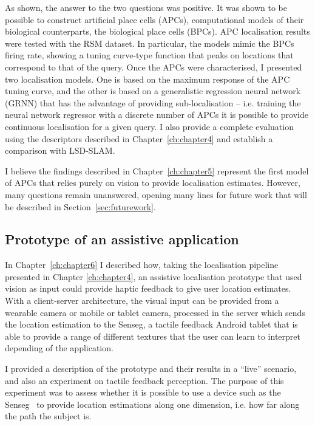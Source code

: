 As shown, the answer to the two questions was positive. It was shown to be possible to construct artificial place cells (APCs), computational models of their biological counterparts, the biological place cells (BPCs). APC localisation results were tested with the RSM dataset. In particular, the models mimic the BPCs firing rate, showing a tuning curve-type function that peaks on locations that correspond to that of the query. Once the APCs were characterised, I presented two localisation models. One is based on the maximum response of the APC tuning curve, and the other is based on a generalistic regression neural network (GRNN) that has the advantage of providing sub-localisation -- i.e. training the neural network regressor with a discrete number of APCs it is possible to provide continuous localisation for a given query. I also provide a complete evaluation using the descriptors described in Chapter~\ref{ch:chapter4} and establish a comparison with LSD-SLAM.

I believe the findings described in Chapter~\ref{ch:chapter5} represent the first model of APCs that relies purely on vision to provide localisation estimates. However, many questions remain unanswered, opening many lines for future work that will be described in Section~\ref{sec:futurework}. 

\subsection{Prototype of an assistive application}

In Chapter~\ref{ch:chapter6} I described how, taking the localisation pipeline presented in Chapter \ref{ch:chapter4}, an assistive localisation prototype that used vision as input could provide haptic feedback to give user location estimates. With a client-server architecture, the visual input can be provided from a wearable camera or mobile or tablet camera, processed in the server which sends the location estimation to the Senseg\texttrademark, a tactile feedback Android tablet that is able to provide a range of different textures that the user can learn to interpret depending of the application.

I provided a description of the prototype and their results in a ``live'' scenario, and also an experiment on tactile feedback perception. The purpose of this experiment was to assess whether it is possible to use a device such as the Senseg\texttrademark~  to provide location estimations along one dimension, i.e. how far along the path the subject is. 

